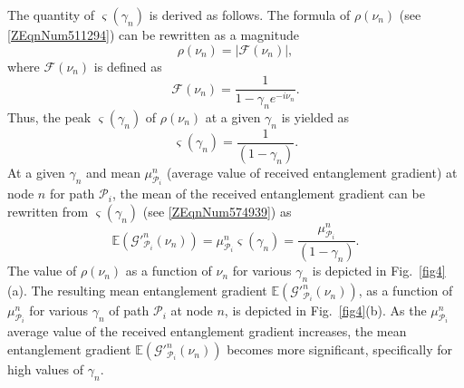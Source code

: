 \documentclass[11pt]{article}%
\newcommand{\fref}[1]{Fig.~\ref{#1}}
\begin{document}
 The quantity of $\varsigma \left({\gamma }_n\right)$ is derived as follows. The formula of $\rho \left({\nu }_n\right)$ (see \eqref{ZEqnNum511294}) can be rewritten as a magnitude 
\begin{equation} \label{50)} 
\rho \left({\nu }_n\right)\mathrm{=}\left|\mathcal{F}\left({\nu }_n\right)\right|,                                                                               
\end{equation} 
where $\mathcal{F}\left({\nu }_n\right)$ is defined as
\begin{equation} \label{51)} 
\mathcal{F}\left({\nu }_n\right)\mathrm{=}\frac{\mathrm{1}}{\mathrm{1-}{\gamma }_ne^{\mathrm{-}i{\nu }_n}}.                                                                           
\end{equation} 
Thus, the peak $\varsigma \left({\gamma }_n\right)$ of $\rho \left({\nu }_n\right)$ at a given ${\gamma }_n$ is yielded as 
\begin{equation} \label{ZEqnNum574939} 
\varsigma \left({\gamma }_n\right)\mathrm{=}\frac{\mathrm{1}}{\left(\mathrm{1-}{\gamma }_n\right)}.                                                                                
\end{equation} 
At a given ${\gamma }_n$ and mean ${\mu }^n_{{\mathcal{P}}_i}$ (average value of received entanglement gradient) at node $n$ for path ${\mathcal{P}}_i$, the mean of the received entanglement gradient can be rewritten from $\varsigma \left({\gamma }_n\right)$ (see \eqref{ZEqnNum574939}) as
\begin{equation} \label{53)} 
\mathbb{E}\left({\mathcal{G}}'^n_{{\mathcal{P}}_i}\left({\nu }_n\right)\right)\mathrm{=}{\mu }^n_{{\mathcal{P}}_i}\varsigma \left({\gamma }_n\right)\mathrm{=}\frac{{\mu }^n_{{\mathcal{P}}_i}}{\left(\mathrm{1-}{\gamma }_n\right)}.                                                         
\end{equation} 
The value of $\rho \left({\nu }_n\right)$ as a function of ${\nu }_n$ for various ${\gamma }_n$ is depicted in \fref{fig4}(a). The resulting mean entanglement gradient $\mathbb{E}\left({\mathcal{G}}'^n_{{\mathcal{P}}_i}\left({\nu }_n\right)\right)$, as a function of ${\mu }^n_{{\mathcal{P}}_i}$ for various ${\gamma }_n$ of path ${\mathcal{P}}_i$ at node $n$, is depicted in \fref{fig4}(b). As the ${\mu }^n_{{\mathcal{P}}_i}$ average value of the received entanglement gradient increases, the mean entanglement gradient $\mathbb{E}\left({\mathcal{G}}'^n_{{\mathcal{P}}_i}\left({\nu }_n\right)\right)$ becomes more significant, specifically for high values of ${\gamma }_n$.\\
\end{document}
